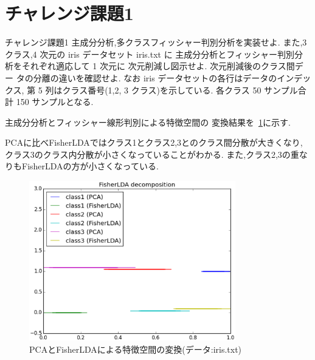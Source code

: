 \section{チャレンジ課題1}\label{section:challenge1}
\begin{itembox}{チャレンジ課題1}
  主成分分析,多クラスフィッシャー判別分析を実装せよ.
  また,3 クラス,4 次元の iris データセット iris.txt に
  主成分分析とフィッシャー判別分析をそれぞれ適応して 1 次元に
  次元削減し図示せよ.
  次元削減後のクラス間デー タの分離の違いを確認せよ.
  なお iris データセットの各行はデータのインデックス,
  第 5 列はクラス番号(1,2, 3 クラス)を示している.
  各クラス 50 サンプル合計 150 サンプルとなる.
\end{itembox}

主成分分析とフィッシャー線形判別による特徴空間の
変換結果を~\ref{fig:challenge1}に示す.

PCAに比べFisherLDAではクラス1とクラス2,3とのクラス間分散が大きくなり,
クラス3のクラス内分散が小さくなっていることがわかる.
また,クラス2,3の重なりもFisherLDAの方が小さくなっている.


\begin{figure}[htbp]
  \centering
  \includegraphics[width=0.8\textwidth]{./assets/challenge1_plot_20150210_050430.eps}
  \caption{PCAとFisherLDAによる特徴空間の変換(データ:iris.txt)}
  \label{fig:challenge1}
\end{figure}